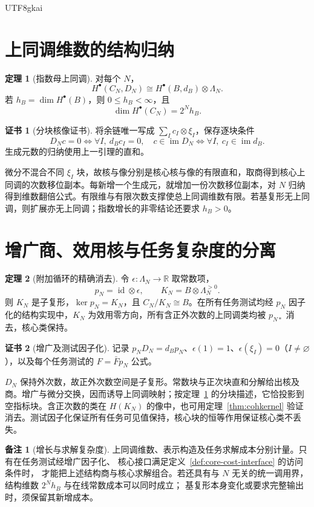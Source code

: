\documentclass[12pt]{report}
\makeatletter
\theoremstyle{definition}
\newtheorem{theorem}{定理}[chapter]
\newtheorem{remark}{备注}[chapter]
\newtheorem{Certificate}{证书}[chapter]
\renewenvironment{proof}[1][\proofname]{\par
  \pushQED{\qed}\normalfont
  \topsep6\p@\@plus6\p@\relax
  \trivlist
  \item[\hskip\labelsep\normalfont #1\@addpunct{.}]\ignorespaces
}{
  \popQED\endtrivlist\@endpefalse
}
\newcommand{\RR}{\mathbb R}
\newcommand{\id}{\operatorname{id}}
\newcommand{\im}{\operatorname{im}}
\makeatother
\begin{document}
\begin{CJK*}{UTF8}{gkai}
\section{上同调维数的结构归纳}
\begin{theorem}[指数母上同调]
\label{thm:growth}
对每个 \(N\)，
\[
H^\bullet(C_N,D_N)\cong H^\bullet(B,d_B)\otimes\Lambda_N.
\]
若 \(h_B=\dim H^\bullet(B)\)，则 \(0\le h_B<\infty\)，且
\[
\dim H^\bullet(C_N)=2^Nh_B.
\]
\end{theorem}
\begin{Certificate}[分块核像证书]
将余链唯一写成 \(\sum_Ic_I\otimes\xi_I\)，保存逐块条件
\[
D_Nc=0\iff\forall I,\ d_Bc_I=0,
\quad
c\in\im D_N\iff\forall I,\ c_I\in\im d_B.
\]
生成元数的归纳使用上一引理的直和。
\end{Certificate}
\begin{proof}
微分不混合不同 \(\xi_I\) 块，故核与像分别是核心核与像的有限直和，取商得到核心上同调的次数移位副本。每新增一个生成元，就增加一份次数移位副本，对 \(N\) 归纳得到维数翻倍公式。有限维与有限次数支撑使总上同调维数有限。若基复形无上同调，则扩展亦无上同调；指数增长的非零结论还要求 \(h_B>0\)。
\end{proof}

\section{增广商、效用核与任务复杂度的分离}
\begin{theorem}[附加循环的精确消去]
\label{thm:augmentation}
令 \(\epsilon:\Lambda_N\to\RR\) 取常数项，
\[
p_N=\id\otimes\epsilon,\qquad
K_N=B\otimes\Lambda_N^{>0}.
\]
则 \(K_N\) 是子复形，\(\ker p_N=K_N\)，且
\(C_N/K_N\cong B\)。在所有任务测试均经 \(p_N\) 因子化的结构实现中，\(K_N\) 为效用零方向，所有含正外次数的上同调类均被 \(p_{N*}\) 消去，核心类保持。
\end{theorem}
\begin{Certificate}[增广及测试因子化]
记录 \(p_ND_N=d_Bp_N\)、\(\epsilon(1)=1\)、\(\epsilon(\xi_I)=0\)（\(I\ne\varnothing\)），以及每个任务测试的 \(F=\bar Fp_N\) 公式。
\end{Certificate}
\begin{proof}
\(D_N\) 保持外次数，故正外次数空间是子复形。常数块与正次块直和分解给出核及商。增广与微分交换，因而诱导上同调映射；按定理~\ref{thm:growth} 的分块描述，它恰投影到空指标块。含正次数的类在 \(H(K_N)\) 的像中，也可用定理~\ref{thm:cohkernel} 验证消去。测试因子化保证所有任务可见值保持，核心块的恒等作用保证核心类不丢失。
\end{proof}
\begin{remark}[增长与求解复杂度]
上同调维数、表示构造及任务求解成本分别计量。只有在任务测试经增广因子化、
核心接口满足定义~\ref{def:core-cost-interface} 的访问条件时，
才能把上述结构商与核心求解组合。若还具有与 \(N\) 无关的统一调用界，
结构维数 \(2^Nh_B\) 与在线常数成本可以同时成立；
基复形本身变化或要求完整输出时，须保留其新增成本。
\end{remark}


\end{CJK*}
\end{document}
